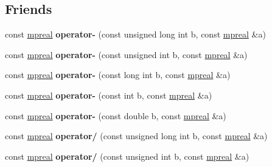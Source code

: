 \subsection*{Friends}
\begin{DoxyCompactItemize}
\item 
\mbox{\label{classmpfr_1_1mpreal_a3347590a0de2e8f7df8ff0084b2242e9}} 
const \hyperlink{classmpfr_1_1mpreal}{mpreal} {\bfseries operator-\/} (const unsigned long int b, const \hyperlink{classmpfr_1_1mpreal}{mpreal} \&a)
\item 
\mbox{\label{classmpfr_1_1mpreal_ad513898c3773f0ae461f2ffe2aad4538}} 
const \hyperlink{classmpfr_1_1mpreal}{mpreal} {\bfseries operator-\/} (const unsigned int b, const \hyperlink{classmpfr_1_1mpreal}{mpreal} \&a)
\item 
\mbox{\label{classmpfr_1_1mpreal_a8cd85c8d1019736dbc5190a63a2f9f90}} 
const \hyperlink{classmpfr_1_1mpreal}{mpreal} {\bfseries operator-\/} (const long int b, const \hyperlink{classmpfr_1_1mpreal}{mpreal} \&a)
\item 
\mbox{\label{classmpfr_1_1mpreal_a3d3f06bd4408bc323a089296bd296b53}} 
const \hyperlink{classmpfr_1_1mpreal}{mpreal} {\bfseries operator-\/} (const int b, const \hyperlink{classmpfr_1_1mpreal}{mpreal} \&a)
\item 
\mbox{\label{classmpfr_1_1mpreal_a84b3fb2edee90cb4b747adbf00a506f1}} 
const \hyperlink{classmpfr_1_1mpreal}{mpreal} {\bfseries operator-\/} (const double b, const \hyperlink{classmpfr_1_1mpreal}{mpreal} \&a)
\item 
\mbox{\label{classmpfr_1_1mpreal_a4891f7a777282e55f91af3d9d028811c}} 
const \hyperlink{classmpfr_1_1mpreal}{mpreal} {\bfseries operator/} (const unsigned long int b, const \hyperlink{classmpfr_1_1mpreal}{mpreal} \&a)
\item 
\mbox{\label{classmpfr_1_1mpreal_a6d31a063369ed841d9ab2fa5d6fb9f2b}} 
const \hyperlink{classmpfr_1_1mpreal}{mpreal} {\bfseries operator/} (const unsigned int b, const \hyperlink{classmpfr_1_1mpreal}{mpreal} \&a)
\item 
\mbox{\label{classmpfr_1_1mpreal_a7e4a3cdf7ed1044458a6f0930b7e32e2}} 

\end{DoxyCompactItemize}
